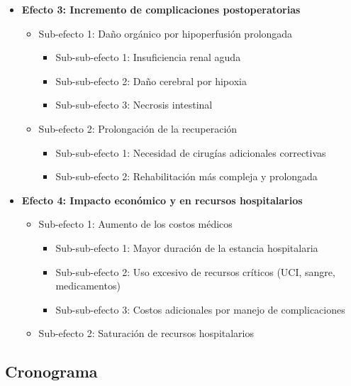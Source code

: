 \documentclass[12pt, letterpaper]{article}
\begin{document}
\begin{itemize}
    \item \textbf{Efecto 3: Incremento de complicaciones postoperatorias}
    \begin{itemize}
        \item Sub-efecto 1: Daño orgánico por hipoperfusión prolongada
        \begin{itemize}
            \item Sub-sub-efecto 1: Insuficiencia renal aguda
            \item Sub-sub-efecto 2: Daño cerebral por hipoxia
            \item Sub-sub-efecto 3: Necrosis intestinal
        \end{itemize}
        \item Sub-efecto 2: Prolongación de la recuperación
        \begin{itemize}
            \item Sub-sub-efecto 1: Necesidad de cirugías adicionales correctivas
            \item Sub-sub-efecto 2: Rehabilitación más compleja y prolongada
        \end{itemize}
    \end{itemize}
    
    \item \textbf{Efecto 4: Impacto económico y en recursos hospitalarios}
    \begin{itemize}
        \item Sub-efecto 1: Aumento de los costos médicos
        \begin{itemize}
            \item Sub-sub-efecto 1: Mayor duración de la estancia hospitalaria
            \item Sub-sub-efecto 2: Uso excesivo de recursos críticos (UCI, sangre, medicamentos)
            \item Sub-sub-efecto 3: Costos adicionales por manejo de complicaciones
        \end{itemize}
        \item Sub-efecto 2: Saturación de recursos hospitalarios
    \end{itemize}
\end{itemize}

\newpage

\subsection*{Cronograma}
\end{document}

